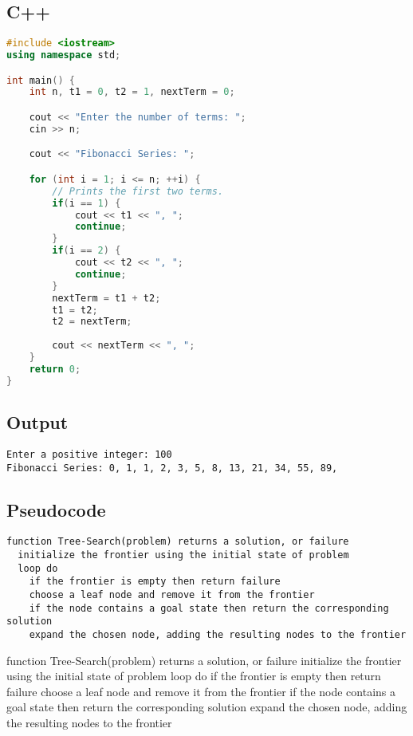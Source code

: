 \documentclass[10pt,titlepage]{article}
\begin{document}
\subsection{C++}

\begin{lstlisting}[language=c++]
#include <iostream>
using namespace std;

int main() {
    int n, t1 = 0, t2 = 1, nextTerm = 0;

    cout << "Enter the number of terms: ";
    cin >> n;

    cout << "Fibonacci Series: ";

    for (int i = 1; i <= n; ++i) {
        // Prints the first two terms.
        if(i == 1) {
            cout << t1 << ", ";
            continue;
        }
        if(i == 2) {
            cout << t2 << ", ";
            continue;
        }
        nextTerm = t1 + t2;
        t1 = t2;
        t2 = nextTerm;
        
        cout << nextTerm << ", ";
    }
    return 0;
}
\end{lstlisting}

\subsection{Output}

\begin{lstlisting}[style=lstoutput]
Enter a positive integer: 100
Fibonacci Series: 0, 1, 1, 2, 3, 5, 8, 13, 21, 34, 55, 89, 
\end{lstlisting}

\subsection{Pseudocode}

\begin{lstlisting}[language=pseudo]
function Tree-Search(problem) returns a solution, or failure
  initialize the frontier using the initial state of problem
  loop do
    if the frontier is empty then return failure
    choose a leaf node and remove it from the frontier
    if the node contains a goal state then return the corresponding solution
    expand the chosen node, adding the resulting nodes to the frontier
\end{lstlisting}

\begin{code}[pseudo]
  function Tree-Search(problem) returns a solution, or failure
  initialize the frontier using the initial state of problem
  loop do
  if the frontier is empty then return failure
  choose a leaf node and remove it from the frontier
  if the node contains a goal state then return the corresponding solution
  expand the chosen node, adding the resulting nodes to the frontier
\end{code}
\end{document}
